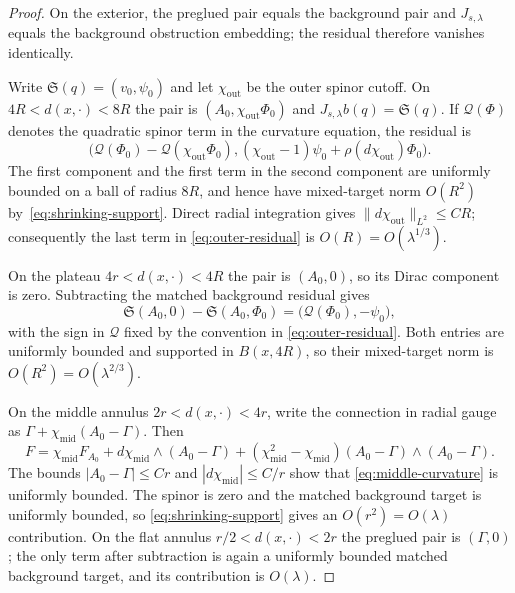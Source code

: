 \documentclass[11pt]{amsart}
\theoremstyle{definition}
\theoremstyle{remark}
\theoremstyle{plain}
\begin{document}
\begin{proof}
On the exterior, the preglued pair equals the background pair and
$J_{s,\lambda}$ equals the background obstruction embedding; the residual
therefore vanishes identically.

Write $\mathfrak S(q)=(v_0,\psi_0)$ and let $\chi_{\mathrm{out}}$ be the outer
spinor cutoff.  On $4R<d(x,\cdot)<8R$ the pair is
$(A_0,\chi_{\mathrm{out}}\Phi_0)$ and
$J_{s,\lambda}b(q)=\mathfrak S(q)$.  If $\mathcal Q(\Phi)$ denotes the
quadratic spinor term in the curvature equation, the residual is
\begin{equation}\label{eq:outer-residual}
 \bigl(\mathcal Q(\Phi_0)-\mathcal Q(\chi_{\mathrm{out}}\Phi_0),
 (\chi_{\mathrm{out}}-1)\psi_0
 +\rho(d\chi_{\mathrm{out}})\Phi_0\bigr).
\end{equation}
The first component and the first term in the second component are uniformly
bounded on a ball of radius $8R$, and hence have mixed-target norm $O(R^2)$
by~\eqref{eq:shrinking-support}.  Direct radial integration gives
$\|d\chi_{\mathrm{out}}\|_{L^2}\leq CR$; consequently the last term in
\eqref{eq:outer-residual} is $O(R)=O(\lambda^{1/3})$.

On the plateau $4r<d(x,\cdot)<4R$ the pair is $(A_0,0)$, so its Dirac
component is zero.  Subtracting the matched background residual gives
\begin{equation}\label{eq:plateau-residual}
 \mathfrak S(A_0,0)-\mathfrak S(A_0,\Phi_0)
 =\bigl(\mathcal Q(\Phi_0),-\psi_0\bigr),
\end{equation}
with the sign in $\mathcal Q$ fixed by the convention in
\eqref{eq:outer-residual}.  Both entries are uniformly bounded and supported
in $B(x,4R)$, so their mixed-target norm is $O(R^2)=O(\lambda^{2/3})$.

On the middle annulus $2r<d(x,\cdot)<4r$, write the connection in radial
gauge as $\Gamma+\chi_{\mathrm{mid}}(A_0-\Gamma)$.  Then
\begin{equation}\label{eq:middle-curvature}
 F=\chi_{\mathrm{mid}}F_{A_0}
   +d\chi_{\mathrm{mid}}\wedge(A_0-\Gamma)
   +(\chi_{\mathrm{mid}}^2-\chi_{\mathrm{mid}})
    (A_0-\Gamma)\wedge(A_0-\Gamma).
\end{equation}
The bounds $|A_0-\Gamma|\leq Cr$ and
$|d\chi_{\mathrm{mid}}|\leq C/r$ show that
\eqref{eq:middle-curvature} is uniformly bounded.  The spinor is zero and the
matched background target is uniformly bounded, so
\eqref{eq:shrinking-support} gives an $O(r^2)=O(\lambda)$ contribution.  On
the flat annulus $r/2<d(x,\cdot)<2r$ the preglued pair is $(\Gamma,0)$; the
only term after subtraction is again a uniformly bounded matched background
target, and its contribution is $O(\lambda)$.


\end{proof}
\end{document}
